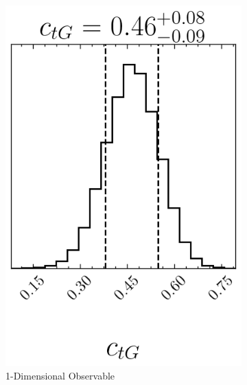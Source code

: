 \documentclass[a4paper,11pt]{article}
\begin{document}
\begin{figure}[htb]
    \centering
    \begin{subfigure}[b]{0.3\textwidth}
        \centering
        \includegraphics[width=\textwidth]{plots/ATLAS-ctg_1D_1OP.png}
        \caption{1-Dimensional Observable}
    \end{subfigure}
    ~
    \begin{subfigure}[b]{0.3\textwidth}
        \centering

\end{subfigure}
\end{figure}
\end{document}

